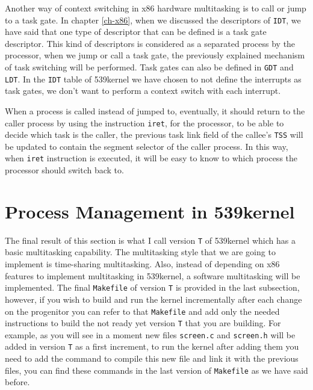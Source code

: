 Another way of context switching in x86 hardware multitasking is to call
or jump to a task gate. In chapter \ref{ch-x86}, when we discussed the
descriptors of \lstinline!IDT!, we have said that one type of descriptor
that can be defined is a task gate descriptor. This kind of descriptors
is considered as a separated process by the processor, when we jump or
call a task gate, the previously explained mechanism of task switching
will be performed. Task gates can also be defined in \lstinline!GDT! and
\lstinline!LDT!. In the \lstinline!IDT! table of 539kernel we have
chosen to not define the interrupts as task gates, we don't want to
perform a context switch with each interrupt.

When a process is called instead of jumped to, eventually, it should
return to the caller process by using the instruction \lstinline!iret!,
for the processor, to be able to decide which task is the caller, the
previous task link field of the callee's \lstinline!TSS! will be updated
to contain the segment selector of the caller process. In this way, when
\lstinline!iret! instruction is executed, it will be easy to know to
which process the processor should switch back to.

\section{Process Management in
539kernel}\label{process-management-in-539kernel}

The final result of this section is what I call version \lstinline!T! of
539kernel which has a basic multitasking capability. The multitasking
style that we are going to implement is time-sharing multitasking. Also,
instead of depending on x86 features to implement multitasking in
539kernel, a software multitasking will be implemented. The final
\lstinline!Makefile! of version \lstinline!T! is provided in the last
subsection, however, if you wish to build and run the kernel
incrementally after each change on the progenitor you can refer to that
\lstinline!Makefile! and add only the needed instructions to build the
not ready yet version \lstinline!T! that you are building. For example,
as you will see in a moment new files \lstinline!screen.c! and
\lstinline!screen.h! will be added in version \lstinline!T! as a first
increment, to run the kernel after adding them you need to add the
command to compile this new file and link it with the previous files,
you can find these commands in the last version of \lstinline!Makefile!
as we have said before.

